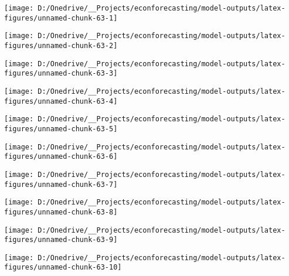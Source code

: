 \documentclass[11pt, letterpaper]{article}\usepackage[]{graphicx}\usepackage[]{color}
\begin{document}
{\centering \texttt{[image: D:/Onedrive/\_\_Projects/econforecasting/model-outputs/latex-figures/unnamed-chunk-63-1]} 

}




{\centering \texttt{[image: D:/Onedrive/\_\_Projects/econforecasting/model-outputs/latex-figures/unnamed-chunk-63-2]} 

}




{\centering \texttt{[image: D:/Onedrive/\_\_Projects/econforecasting/model-outputs/latex-figures/unnamed-chunk-63-3]} 

}




{\centering \texttt{[image: D:/Onedrive/\_\_Projects/econforecasting/model-outputs/latex-figures/unnamed-chunk-63-4]} 

}




{\centering \texttt{[image: D:/Onedrive/\_\_Projects/econforecasting/model-outputs/latex-figures/unnamed-chunk-63-5]} 

}




{\centering \texttt{[image: D:/Onedrive/\_\_Projects/econforecasting/model-outputs/latex-figures/unnamed-chunk-63-6]} 

}




{\centering \texttt{[image: D:/Onedrive/\_\_Projects/econforecasting/model-outputs/latex-figures/unnamed-chunk-63-7]} 

}




{\centering \texttt{[image: D:/Onedrive/\_\_Projects/econforecasting/model-outputs/latex-figures/unnamed-chunk-63-8]} 

}




{\centering \texttt{[image: D:/Onedrive/\_\_Projects/econforecasting/model-outputs/latex-figures/unnamed-chunk-63-9]} 

}




{\centering \texttt{[image: D:/Onedrive/\_\_Projects/econforecasting/model-outputs/latex-figures/unnamed-chunk-63-10]} 

}
\end{document}

